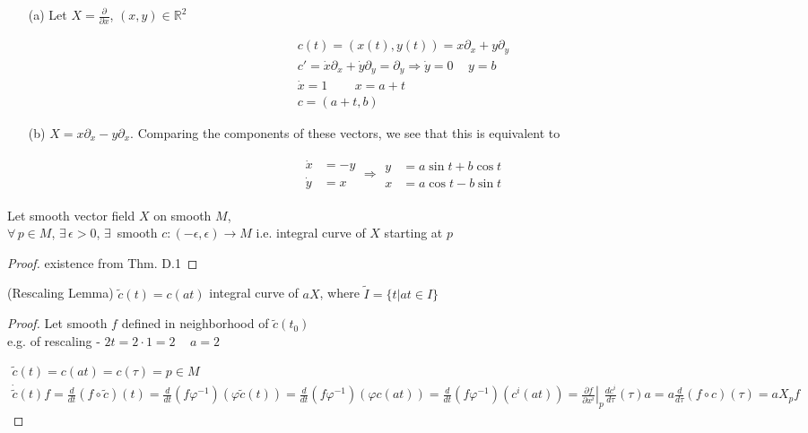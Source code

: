 \begin{enumerate}
\item[(a)] Let $X = \frac{ \partial }{ \partial x}$, $(x,y) \in \mathbb{R}^2$ 

\[
\begin{gathered}
  c(t) = (x(t), y(t)) = x \partial_x + y\partial_y \\ 
  c' = \dot{x} \partial_x + \dot{y} \partial_y = \partial_y   \Longrightarrow \dot{y} = 0 \quad \, y = b \\
  \dot{x} = 1 \quad \quad \, x = a+t \\ 
  c = (a+t ,b) 
\end{gathered}
\]


\item[(b)] $X = x\partial_x - y \partial_x$.  Comparing the components of these vectors, we see that this is equivalent to 

\[
\begin{gathered}
  \begin{aligned}
    \dot{x} & = -y \\
    \dot{y}  & = x \end{aligned} \Longrightarrow \begin{aligned}
    y & = a \sin{t} + b\cos{t} \\ 
    x & = a\cos{t} - b\sin{t} \end{aligned}
\end{gathered}
\]



\end{enumerate}


\begin{proposition}[9.2] Let smooth vector field $X$ on smooth $M$, \\
$\forall \, p \in M$, $\exists \, \epsilon > 0 $, $\exists \, $ smooth $c:(-\epsilon, \epsilon) \to M$ i.e. integral curve of $X$ starting at $p$ \end{proposition}

\begin{proof}
  existence from Thm. D.1
\end{proof}


\begin{lemma}[9.3] (Rescaling Lemma) 
$\widetilde{ c}(t) = c(at)$ integral curve of $aX$, where $\widetilde{I} = \lbrace t | at \in I \rbrace$
\end{lemma}
\begin{proof} Let smooth $f$ defined in neighborhood of $\widetilde{c}(t_0)$ \\
e.g. of rescaling  - $2t = 2\cdot 1 = 2 \quad \, a=2$ 

\[
\begin{gathered}
  \widetilde{c}(t) = c(at) = c(\tau) = p \in M \\ 
  \dot{ \widetilde{c}}(t) f = \frac{d}{dt} (f\circ \widetilde{c})(t) = \frac{d}{dt} (f\varphi^{-1})( \varphi\widetilde{c}(t)) = \frac{d}{dt} (f\varphi^{-1})(\varphi c(at) ) = \frac{d}{dt} (f\varphi^{-1})(c^i(at)) = \left. \frac{ \partial f}{ \partial x^i} \right|_p \frac{dc^i}{ d\tau}(\tau)a = a \frac{d}{d \tau}(f\circ c)(\tau) = aX_p f
\end{gathered}
\]


\end{proof}

